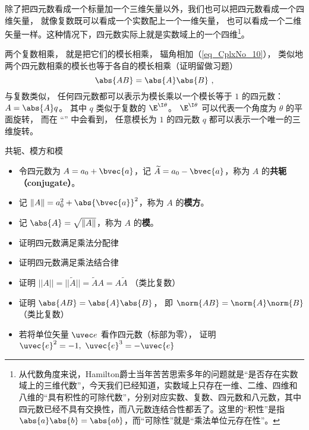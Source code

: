 除了把四元数看成一个标量加一个三维矢量以外，我们也可以把四元数看成一个四维矢量， 就像复数既可以看成一个实数配上一个一维矢量， 也可以看成一个二维矢量一样。这种情况下，四元数实际上就是实数域上的一个四维\footnote{从代数角度来说，Hamilton爵士当年苦苦思索多年的问题就是“是否存在实数域上的三维代数”，今天我们已经知道，实数域上只存在一维、二维、四维和八维的“具有积性的可除代数”，分别对应实数、复数、四元数和八元数，其中四元数已经不具有交换性，而八元数连结合性都丢了。这里的“积性”是指 $\abs{a}\abs{b}=\abs{ab}$，而“可除性”就是“乘法单位元存在性”。}。

两个复数相乘， 就是把它们的模长相乘， 辐角相加（\autoref{eq_CplxNo_10}）， 类似地两个四元数相乘的模长也等于各自的模长相乘（证明留做习题）
\begin{equation}
\abs{AB} = \abs{A}\abs{B}~,
\end{equation}
与复数类似， 任何四元数都可以表示为模长乘以一个模长等于 $1$ 的四元数： $A = \abs{A} q$。 其中 $q$ 类似于复数的 $\E^{\I\theta}$。 $\E^{\I\theta}$ 可以代表一个角度为 $\theta$ 的平面旋转， 而在 “” 中会看到， 任意模长为 $1$ 的四元数 $q$ 都可以表示一个唯一的三维旋转。 

\begin{definition}{共轭、模方和模}\label{def_Quat_2}
\begin{itemize}
\item 令四元数为 $A=a_0+\bvec{a}$，记 $\widetilde{A}=a_0-\bvec{a}$，称为 $A$ 的\textbf{共轭（conjugate）}。
\item 记 $\Vert A \Vert=a_0^2+ \abs{\bvec{a}}^2$，称为 $A$ 的\textbf{模方}。
\item 记 $\abs{A}=\sqrt{\Vert A\Vert}$，称为 $A$ 的\textbf{模}。
\end{itemize}
\end{definition}

\begin{exercise}{}\label{exe_Quat_1}
\begin{itemize}
\item 证明四元数满足乘法分配律
\item 证明四元数满足乘法结合律
\item 证明 $||A||=||\widetilde{A}||=\widetilde{A}A=A\widetilde{A}$ （类比复数）
\item 证明 $\abs{AB} = \abs{A}\abs{B}$， 即 $\norm{AB} = \norm{A}\norm{B}$ （类比复数）
\item 若将单位矢量 $\uvec e$ 看作四元数（标部为零）， 证明 $\uvec{e}^2=-1,\ \uvec{e}^3=-\uvec{e}$
\end{itemize}
\end{exercise}

